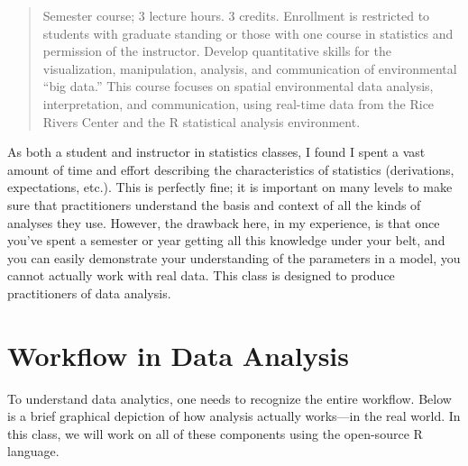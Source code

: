 \documentclass[
  letterpaper,
]{book}
\begin{document}
\begin{quote}
Semester course; 3 lecture hours. 3 credits. Enrollment is restricted to
students with graduate standing or those with one course in statistics
and permission of the instructor. Develop quantitative skills for the
visualization, manipulation, analysis, and communication of
environmental ``big data.'' This course focuses on spatial environmental
data analysis, interpretation, and communication, using real-time data
from the Rice Rivers Center and the R statistical analysis environment.
\end{quote}

As both a student and instructor in statistics classes, I found I spent
a vast amount of time and effort describing the characteristics of
statistics (derivations, expectations, etc.). This is perfectly fine; it
is important on many levels to make sure that practitioners understand
the basis and context of all the kinds of analyses they use. However,
the drawback here, in my experience, is that once you've spent a
semester or year getting all this knowledge under your belt, and you can
easily demonstrate your understanding of the parameters in a model, you
cannot actually work with real data. This class is designed to produce
practitioners of data analysis.

\section*{Workflow in Data Analysis}\label{workflow-in-data-analysis}


To understand data analytics, one needs to recognize the entire
workflow. Below is a brief graphical depiction of how analysis actually
works---in the real world. In this class, we will work on all of these
components using the open-source R language.
\end{document}
